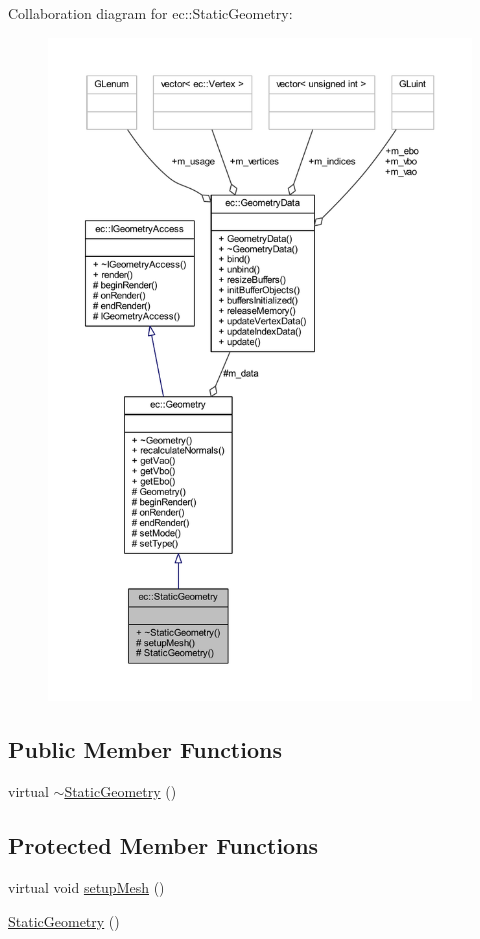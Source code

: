 Collaboration diagram for ec\+:\+:Static\+Geometry\+:\nopagebreak
\begin{figure}[H]
\begin{center}
\leavevmode
\includegraphics[width=350pt]{classec_1_1_static_geometry__coll__graph}
\end{center}
\end{figure}
\subsection*{Public Member Functions}
\begin{DoxyCompactItemize}
\item 
virtual \mbox{\hyperlink{classec_1_1_static_geometry_a47d1f09c1042762be9a9d4a492db2366}{$\sim$\+Static\+Geometry}} ()
\end{DoxyCompactItemize}
\subsection*{Protected Member Functions}
\begin{DoxyCompactItemize}
\item 
virtual void \mbox{\hyperlink{classec_1_1_static_geometry_a971d3c59c50d0ae540b95ecb77d5a05a}{setup\+Mesh}} ()
\item 
\mbox{\hyperlink{classec_1_1_static_geometry_ad707c706ce148f5c9d6d8ddb2321807b}{Static\+Geometry}} ()
\end{DoxyCompactItemize}
